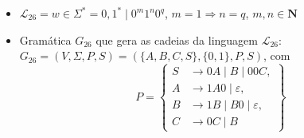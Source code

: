 \documentclass[12pt]{article}
\def\discente{Iury Alexandre Alves Bo}
\def\matricula{202103735}
\def\myling{{26}} %
\newcommand{\ve}{\ensuremath{\varepsilon}}
\begin{document}
%
\begin{tcolorbox}[rounded corners, colback=yellow!5, colframe=red!40!black, title={\discente\ (\matricula)}]
\begin{itemize}
  \item  $\mathcal{L}_{\myling} = w \in \Sigma^* = {0,1}^* \mid 0^m1^n0^q$, $m = 1 \Longrightarrow n = q$, $m,n \in \mathbf{N}$
  \item Gramática $G_{\myling}$ que gera as cadeias da linguagem $\mathcal{L}_{\myling}$:\\
  $G_{\myling}=(V,\Sigma,P,S)=(\{A,B,C,S\},\{0,1\},P,S)$, com
    \[P=\left\{
     \begin{aligned}
      S & \to 0A \mid B \mid 00C, \\
      A & \to 1A0 \mid \ve, \\
      B & \to 1B \mid B0 \mid \ve, \\
      C & \to 0C \mid B 
     \end{aligned}
    \right\}\]
 \end{itemize}
\end{tcolorbox}\bigskip
\end{document}
